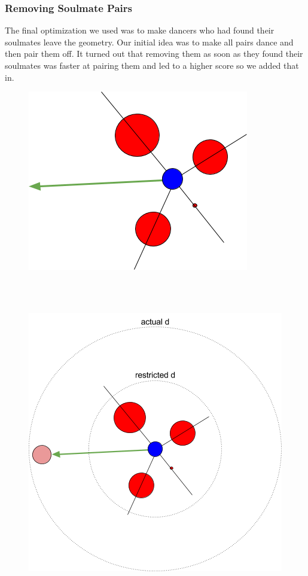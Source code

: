 \subsubsection{Removing Soulmate Pairs}
The final optimization we used was to make dancers who had found their soulmates leave the geometry. Our initial idea was to make all pairs dance and then pair them off. It turned out that removing them as soon as they found their soulmates was faster at pairing them and led to a higher score so we added that in.\\

\begin{figure}[h]
\center
\includegraphics[scale=1]{angle.png}
\caption{}
\label{fig:angle}
\end{figure}

\\
\\


\begin{figure}[h]
\center
\includegraphics[scale=1]{angle2.png}
\caption{}
\label{fig:angle2}
\end{figure}


